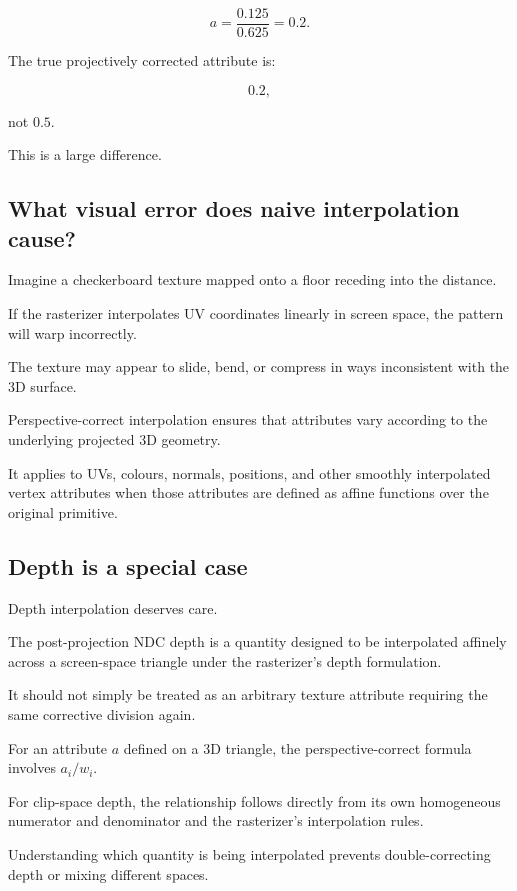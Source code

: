 \[
 \boxed{ a=\frac{0.125}{0.625}=0.2 }.
\]

The true projectively corrected attribute is:

\[
 \boxed{0.2},
\]

not \(0.5\).

This is a large difference.

\subsection{What visual error does naive interpolation cause?}\label{02-foundations-ii-ch034-what-visual-error-does-naive-interpolation-cause}

Imagine a checkerboard texture mapped onto a floor receding into the distance.

If the rasterizer interpolates UV coordinates linearly in screen space, the pattern will warp incorrectly.

The texture may appear to slide, bend, or compress in ways inconsistent with the 3D surface.

Perspective-correct interpolation ensures that attributes vary according to the underlying projected 3D geometry.

It applies to UVs, colours, normals, positions, and other smoothly interpolated vertex attributes when those attributes are defined as affine functions over the original primitive.

\subsection{Depth is a special case}\label{02-foundations-ii-ch034-depth-is-a-special-case}

Depth interpolation deserves care.

The post-projection NDC depth is a quantity designed to be interpolated affinely across a screen-space triangle under the rasterizer's depth formulation.

It should not simply be treated as an arbitrary texture attribute requiring the same corrective division again.

For an attribute \(a\) defined on a 3D triangle, the perspective-correct formula involves \(a_i/w_i\).

For clip-space depth, the relationship follows directly from its own homogeneous numerator and denominator and the rasterizer's interpolation rules.

Understanding which quantity is being interpolated prevents double-correcting depth or mixing different spaces.

